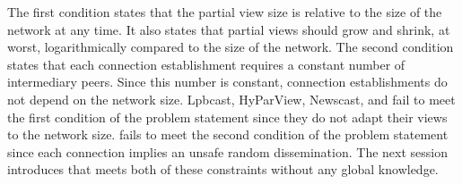 The first condition states that the partial view size is relative to the size of
the network at any time. It also states that partial views should grow and
shrink, at worst, logarithmically compared to the size of the network. The
second condition states that each connection establishment requires a constant
number of intermediary peers. Since this number is constant, connection
establishments do not depend on the network size.
Lpbcast, HyParView, Newscast, and \CYCLON fail to meet the first condition of
the problem statement since they do not adapt their views to the network
size. \SCAMP fails to meet the second condition of the problem statement since
each connection implies an unsafe random dissemination. The next session
introduces \SPRAY that meets both of these constraints without any global
knowledge.


